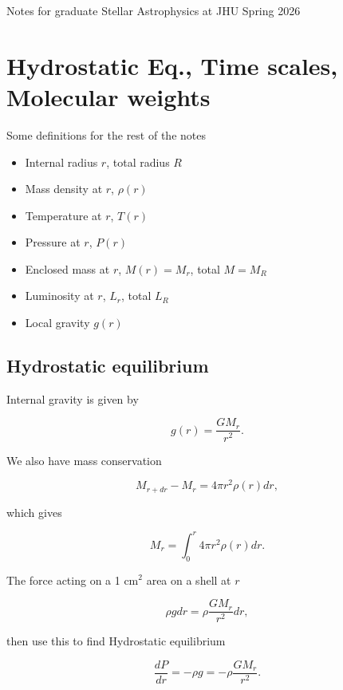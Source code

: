 \documentclass{article}
\begin{document}
Notes for graduate Stellar Astrophysics at JHU Spring 2026

\section{Hydrostatic Eq., Time scales, Molecular weights}

Some definitions for the rest of the notes

\begin{itemize}
    \item Internal radius $r$, total radius $R$
    \item Mass density at $r$, $\rho(r)$
    \item Temperature at $r$, $T(r)$
    \item Pressure at $r$, $P(r)$
    \item Enclosed mass at $r$, $M(r) = M_r$, total $M = M_R$
    \item Luminosity at $r$, $L_r$, total $L_R$
    \item Local gravity $g(r)$
\end{itemize}

\subsection{Hydrostatic equilibrium}

Internal gravity is given by

\begin{equation}
    g(r) = \frac{GM_r}{r^2}.
\end{equation}

We also have mass conservation

\begin{equation}
    M_{r + dr} - M_r = 4\pi r^2 \rho(r)dr,
\end{equation}

which gives 

\begin{equation}
    M_r = \int_0^r 4\pi r^2 \rho(r)dr.
\end{equation}

The force acting on a 1 cm$^2$ area on a shell at $r$

\begin{equation}
    \rho g dr = \rho \frac{GM_r}{r^2}dr,
\end{equation}

then use this to find Hydrostatic equilibrium 

\begin{equation}
    \boxed{\frac{dP}{dr} = -\rho g = -\rho \frac{GM_r}{r^2}}.
\end{equation}
\end{document}

